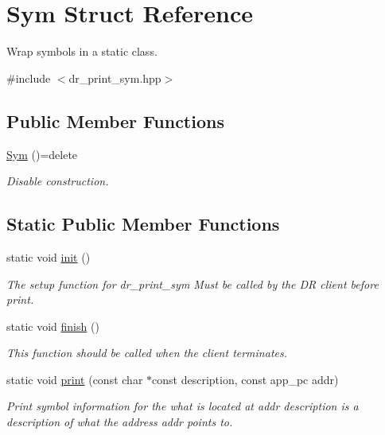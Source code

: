 \hypertarget{struct_sym}{}\section{Sym Struct Reference}
\label{struct_sym}


Wrap symbols in a static class.  




{\ttfamily \#include $<$dr\+\_\+print\+\_\+sym.\+hpp$>$}

\subsection*{Public Member Functions}
\begin{DoxyCompactItemize}
\item 
\hyperlink{struct_sym_aa2c1e0336fc028030e91c380230a0ae3}{Sym} ()=delete
\begin{DoxyCompactList}\small\item\em Disable construction. \end{DoxyCompactList}\end{DoxyCompactItemize}
\subsection*{Static Public Member Functions}
\begin{DoxyCompactItemize}
\item 
static void \hyperlink{struct_sym_aa14d1ce9dbef3383d591499714c4d164}{init} ()
\begin{DoxyCompactList}\small\item\em The setup function for dr\+\_\+print\+\_\+sym Must be called {\itshape by the DR client} before print. \end{DoxyCompactList}\item 
static void \hyperlink{struct_sym_a474eb27bfe01436357e0be478020611c}{finish} ()
\begin{DoxyCompactList}\small\item\em This function should be called when the client terminates. \end{DoxyCompactList}\item 
static void \hyperlink{struct_sym_abe62e638eae7f459e420c7361e41fe71}{print} (const char $\ast$const description, const app\+\_\+pc addr)
\begin{DoxyCompactList}\small\item\em Print symbol information for the what is located at addr description is a description of what the address addr points to. \end{DoxyCompactList}\end{DoxyCompactItemize}
